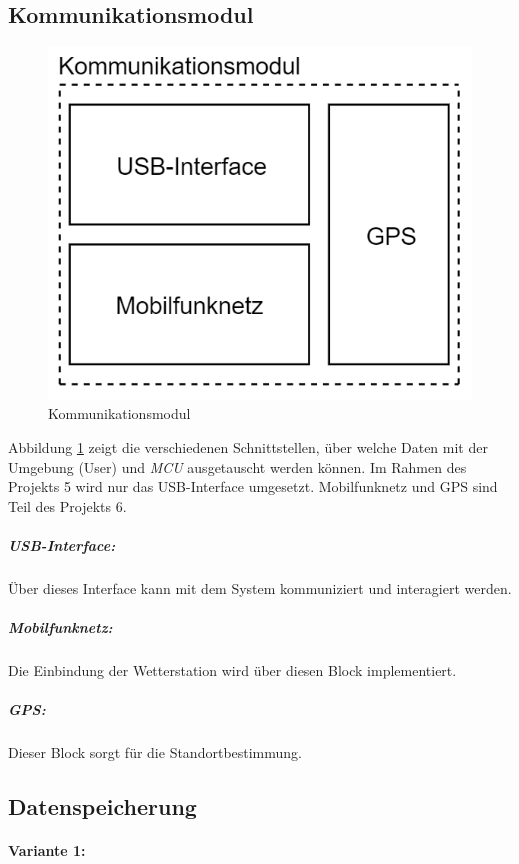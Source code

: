 \subsection{Kommunikationsmodul}
\begin{figure}[h]
\centering
\includegraphics[scale=0.7]{graphics/Kommunikationsmodul.PNG}
\caption{Kommunikationsmodul}
\label{fig:kommunikationsmodul}
\end{figure}
Abbildung \ref{fig:kommunikationsmodul} zeigt die verschiedenen Schnittstellen, über welche Daten mit der Umgebung (User) und \textit{MCU} ausgetauscht werden können. Im Rahmen des Projekts 5 wird nur das USB-Interface umgesetzt. Mobilfunknetz und GPS sind Teil des Projekts 6.\\

\subparagraph{USB-Interface:}
Über dieses Interface kann mit dem System kommuniziert und interagiert werden.\\

\subparagraph{Mobilfunknetz:}
Die Einbindung der Wetterstation wird über diesen Block implementiert.\\

\subparagraph{GPS:}
Dieser Block sorgt für die Standortbestimmung.\\

\subsection{Datenspeicherung}
\paragraph{Variante 1:}

